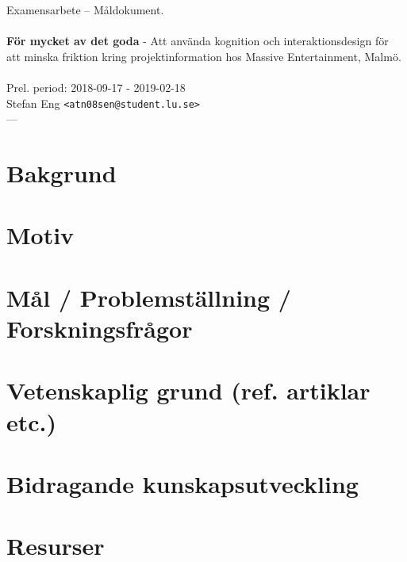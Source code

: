 \documentclass{article}
\begin{document}
\begin{center}

  Examensarbete -- Måldokument. \\
  \ \\
  {\large
    \textbf{För mycket av det goda} -
    Att använda kognition och interaktionsdesign för
    att minska friktion kring projektinformation hos Massive
    Entertainment, Malmö. \\
  }
  \ \\
  Prel. period: 2018-09-17 - 2019-02-18\\
  Stefan Eng \texttt{<atn08sen@student.lu.se>}
  \ \\
  ---
  \vspace{-0.3cm}

\end{center}

\section*{Bakgrund}

\section*{Motiv}

\section*{Mål / Problemställning / Forskningsfrågor}

\section*{Vetenskaplig grund (ref. artiklar etc.)}

\section*{Bidragande kunskapsutveckling}

\section*{Resurser}
\end{document}
